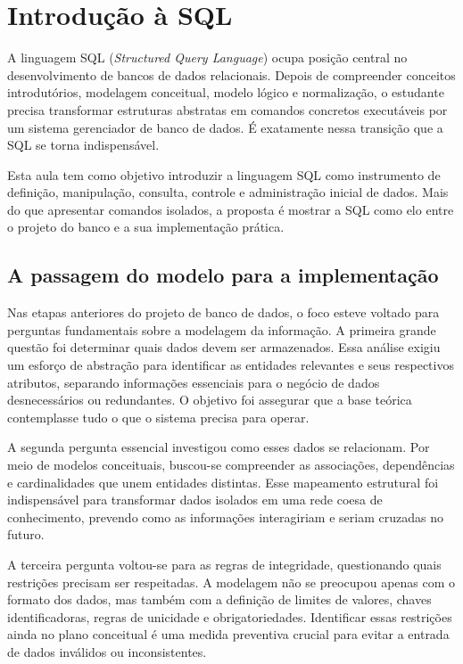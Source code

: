 \chapter{Introdução à SQL}
\label{cap:introducao_sql}

A linguagem SQL (\textit{Structured Query Language}) ocupa posição central no desenvolvimento de bancos de dados relacionais. Depois de compreender conceitos introdutórios, modelagem conceitual, modelo lógico e normalização, o estudante precisa transformar estruturas abstratas em comandos concretos executáveis por um sistema gerenciador de banco de dados. É exatamente nessa transição que a SQL se torna indispensável.

Esta aula tem como objetivo introduzir a linguagem SQL como instrumento de definição, manipulação, consulta, controle e administração inicial de dados. Mais do que apresentar comandos isolados, a proposta é mostrar a SQL como elo entre o projeto do banco e a sua implementação prática.

\section{A passagem do modelo para a implementação}

Nas etapas anteriores do projeto de banco de dados, o foco esteve voltado para perguntas fundamentais sobre a modelagem da informação. A primeira grande questão foi determinar quais dados devem ser armazenados. Essa análise exigiu um esforço de abstração para identificar as entidades relevantes e seus respectivos atributos, separando informações essenciais para o negócio de dados desnecessários ou redundantes. O objetivo foi assegurar que a base teórica contemplasse tudo o que o sistema precisa para operar.

A segunda pergunta essencial investigou como esses dados se relacionam. Por meio de modelos conceituais, buscou-se compreender as associações, dependências e cardinalidades que unem entidades distintas. Esse mapeamento estrutural foi indispensável para transformar dados isolados em uma rede coesa de conhecimento, prevendo como as informações interagiriam e seriam cruzadas no futuro.

A terceira pergunta voltou-se para as regras de integridade, questionando quais restrições precisam ser respeitadas. A modelagem não se preocupou apenas com o formato dos dados, mas também com a definição de limites de valores, chaves identificadoras, regras de unicidade e obrigatoriedades. Identificar essas restrições ainda no plano conceitual é uma medida preventiva crucial para evitar a entrada de dados inválidos ou inconsistentes.

